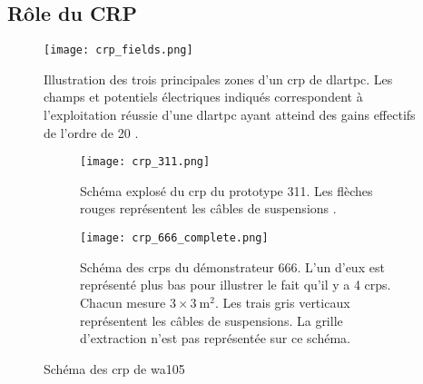         \subsection{Rôle du CRP}\label{sec::crp_intro}
            \begin{figure}[htbp]
                \begin{center}\texttt{[image: crp\_fields.png]}\end{center}
                \caption[Champs électriques d'un  \gls{crp}.]{Illustration des trois principales zones d'un \gls{crp} de \gls{dlartpc}. Les champs et potentiels électriques indiqués correspondent à l'exploitation réussie d'une \gls{dlartpc} ayant atteind des gains effectifs de l'ordre de 20 \cite{311paper2018,cantini3L}.}
                \label{fig::crp_fields}
            \end{figure}
            \begin{figure}[htbp]
                \begin{subfigure}[b]{\textwidth}
                    \begin{center}\texttt{[image: crp\_311.png]}\end{center}
                    \caption[\gls{crp} du prototype 311]{Schéma explosé du \gls{crp} du prototype 311. Les flèches rouges représentent les câbles de suspensions \cite{311paper2018}.}
                    \label{fig::crp_311}
                \end{subfigure}
                \begin{subfigure}[b]{\textwidth}
                    \begin{center}\texttt{[image: crp\_666\_complete.png]}\end{center}
                    \caption[\glspl{crp} du démonstrateur 666]{Schéma des \glspl{crp} du démonstrateur 666. L'un d'eux est représenté plus bas pour illustrer le fait qu'il y a 4 \glspl{crp}. Chacun mesure $3\times\SI{3}{\meter\squared}$. Les trais gris verticaux représentent les câbles de suspensions. La grille d'extraction n'est pas représentée sur ce schéma. \cite{talk_crp_lapp}}
                    \label{fig::crp_666}
                \end{subfigure}
                \caption{Schéma des \gls{crp} de \gls{wa105}}
            \end{figure}
        
